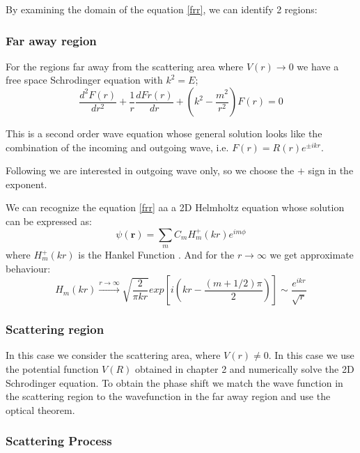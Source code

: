 By examining the domain of the equation \eqref{frr},  we can identify 2 regions:

\subsubsection{\textbf{Far away region}}
 For the regions far away from the scattering area where $ V(r) \rightarrow 0 $ we have a free space Schrodinger equation with $ k^2 = E $;
\begin{equation}\label{2DS1H}
\frac{d^2 F(r)}{dr^2} + \frac{1}{r}\frac{d Fr(r)}{dr} + \left(k^2 - \frac{m^2}{r^2}\right)F(r) = 0
\end{equation}

This is a second order wave equation whose general solution looks like the combination of the incoming and outgoing wave, i.e. $ F(r) = R(r)e^{\pm ikr} $.

Following \cite{2DScatterLessons} we are interested in outgoing wave only, so we choose the $ + $ sign in the exponent.

We can recognize the equation \eqref{frr} aa a 2D Helmholtz equation whose solution can be expressed as:
\begin{equation}\label{2DS2H}
\psi(\mathbf{r}) = \sum_{m}{C_mH_m^+(kr)e^{im\phi}}
\end{equation}
where $ H_m^+(kr) $ is the Hankel Function .
And for the $ r \rightarrow \infty $ we get approximate behaviour:
\begin{equation}\label{2DS2}
H_m(kr) \xrightarrow{r \rightarrow \infty}\sqrt{\frac{2}{\pi k r}}exp\left[i\left(kr - \frac{(m + 1/2)\pi}{2}\right)\right] \sim \frac{e^{ikr}}{\sqrt{r}}
\end{equation}

\subsubsection{\textbf{Scattering region}}

In this case we consider the scattering area, where $ V(r) \neq 0 $. In this case we use the potential function $ V(R) $ obtained in chapter 2 and numerically solve the 2D Schrodinger equation. To obtain the phase shift we match the wave function in the scattering region to the wavefunction in the far away region and use the optical theorem.

\subsubsection{Scattering Process}

